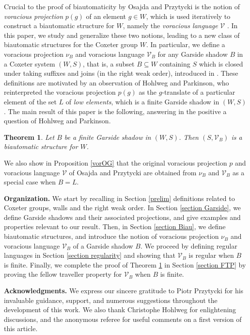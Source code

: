 \documentclass[a4paper,12pt,leqno]{amsart}
\newtheorem{thm}[theorem]{Theorem}
\theoremstyle{definition}
\newcommand{\V}{\mathcal{V}}
\newcommand{\vr}{\nu}
\begin{document}
Crucial to the proof of biautomaticity by Osajda and Przytycki is the notion of \emph{voracious projection} $p(g)$ of an element $g \in W$, which is used iteratively to construct a biautomatic structure for $W$, namely the \emph{voracious language} $\V$ \cite{OP-bi}. In this paper, we study and generalize these two notions, leading to a new class of biautomatic structures for the Coxeter group $W$. In particular, we define a voracious projection $\vr_B$ and voracious language $\V_B$ for any Garside shadow $B$ in a Coxeter system $(W,S)$, that is, a subset $B \subseteq W$ containing $S$ which is closed under taking suffixes and joins (in the right weak order), introduced in \cite{DH-Garside}. These definitions are motivated by an observation of Hohlweg and Parkinson, who reinterpreted the voracious projection $p(g)$ as the $g$-translate of a particular element of the set $L$ of \emph{low elements}, which is a finite Garside shadow in $(W,S)$. The main result of this paper is the following, answering in the positive a question of Hohlweg and Parkinson.  

\begin{thm} \label{mainthm}
Let $B$ be a finite Garside shadow in $(W,S)$. Then $(S,\V_B)$ is a biautomatic structure for $W$.
\end{thm}

We also show in Proposition \ref{vorOG} that the original voracious projection $p$ and voracious language $\V$ of Osajda and Przytycki are obtained from $\vr_B$ and $\V_B$ as a special case when $B = L$. 

\medskip

\noindent \textbf{Organization.} We start by recalling in Section \ref{prelim} definitions related to Coxeter groups, walls and the right weak order. In Section \ref{section Garside}, we define Garside shadows and their associated projections, and give examples and properties relevant to our result. Then, in Section \ref{section Biau}, we define biautomatic structures, and introduce the notion of voracious projection $\vr_B$ and voracious language $\V_B$ of a Garside shadow $B$. We proceed by defining regular languages in Section \ref{section regularity} and showing that $\V_B$ is regular when $B$ is finite. Finally, we complete the proof of Theorem \ref{mainthm} in Section \ref{section FTP} by proving the fellow traveller property for $\V_B$ when $B$ is finite.  

\medskip

\noindent \textbf{Acknowledgments.} We express our sincere gratitude to Piotr Przytycki for his invaluable guidance, support, and numerous suggestions throughout the development of this work. We also thank Christophe Hohlweg for enlightening discussions, and the anonymous referee for useful comments on a first version of this article.
\end{document}
